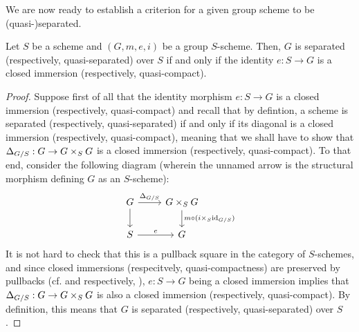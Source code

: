                 We are now ready to establish a criterion for a given group scheme to be (quasi-)separated.
                \begin{proposition} \label{prop: (quasi)_separatedness_criterion_for_group_schemes}
                    Let $S$ be a scheme and $(G, m, e, i)$ be a group $S$-scheme. Then, $G$ is separated (respectively, quasi-separated) over $S$ if and only if the identity $e: S \to G$ is a closed immersion (respectively, quasi-compact).
                \end{proposition}
                    \begin{proof}
                        Suppose first of all that the identity morphism $e: S \to G$ is a closed immersion (respectively, quasi-compact) and recall that by defintion, a scheme is separated (respectively, quasi-separated) if and only if its diagonal is a closed immersion (respectively, quasi-compact), meaning that we shall have to show that $\Delta_{G/S}: G \to G \x_S G$ is a closed immersion (respectively, quasi-compact). To that end, consider the following diagram (wherein the unnamed arrow is the structural morphism defining $G$ as an $S$-scheme):
                            $$
                                \begin{tikzcd}
                                	G & {G \x_S G} \\
                                	S & G
                                	\arrow["{\Delta_{G/S}}", from=1-1, to=1-2]
                                	\arrow["e", from=2-1, to=2-2]
                                	\arrow[from=1-1, to=2-1]
                                	\arrow["{m \circ (i \x_S \id_{G/S})}", from=1-2, to=2-2]
                                \end{tikzcd}
                            $$
                        It is not hard to check that this is a pullback square in the category of $S$-schemes, and since closed immersions (respecitvely, quasi-compactness) are preserved by pullbacks (cf. \cite[\href{https://stacks.math.columbia.edu/tag/01JY}{Tag 01JY}]{stacks} and respectively, \cite[\href{https://stacks.math.columbia.edu/tag/01K5}{Tag 01K5}]{stacks}), $e: S \to G$ being a closed immersion implies that $\Delta_{G/S}: G \to G \x_S G$ is also a closed immersion (respectively, quasi-compact). By definition, this means that $G$ is separated (respectively, quasi-separated) over $S$.
                        

\end{proof}
